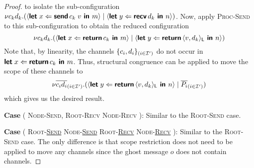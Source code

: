 \begin{proof}
  to isolate the sub-configuration 
  ${\nu{c_k d_k}.{({\langle{\textbf{\textsf{let}}\;{x}\Leftarrow{{\textbf{\textsf{send}}\,{c_k}}\;{v}}\textbf{\textsf{ in }}{m}}\rangle} \mid {\langle{\textbf{\textsf{let}}\;{y}\Leftarrow{\textbf{\textsf{recv}}\,{d_k}}\textbf{\textsf{ in }}{n}}\rangle})}}$.
  Now, apply \textsc{Proc-Send} to this sub-configuration to obtain the reduced configuration
  $$
    {\nu{c_k d_k}.{(
      {\langle{\textbf{\textsf{let}}\;{x}\Leftarrow{\textbf{\textsf{return}}\,{c_k}}\textbf{\textsf{ in }}{m}}\rangle} 
      \mid {\langle{\textbf{\textsf{let}}\;{y}\Leftarrow{\textbf{\textsf{return}}\,{\langle{{v},{d_k}}\rangle_{\textsf{L}}}}\textbf{\textsf{ in }}{n}}\rangle}
    )}}
  $$
  Note that, by linearity, the channels $\{ c_i, d_i \}_{(i \in \mathcal{I}')}$ do not occur in 
  $\textbf{\textsf{let}}\;{x}\Leftarrow{\textbf{\textsf{return}}\,{c_k}}\textbf{\textsf{ in }}{m}$.
  Thus, structural congruence can be applied to move the scope of these channels to
  $${\nu{\overline{c_i d_i}_{(i \in \mathcal{I}')}}.{
    ({\langle{\textbf{\textsf{let}}\;{y}\Leftarrow{\textbf{\textsf{return}}\,{\langle{{v},{d_k}}\rangle_{\textsf{L}}}}\textbf{\textsf{ in }}{n}}\rangle} \mid \overline{P_i}_{(i \in \mathcal{I}')})}}$$
  which gives us the desired result.

\noindent
\textbf{Case} (
  \textsc{Node-Send}, 
  \textsc{Root-Recv}
  \textsc{Node-Recv}
): Similar to the \textsc{Root-Send} case.

\noindent
\textbf{Case} (
  \textsc{Root-\underline{Send}}
  \textsc{Node-\underline{Send}}
  \textsc{Root-\underline{Recv}}
  \textsc{Node-\underline{Recv}}
): Similar to the \textsc{Root-Send} case.
The only difference is that scope restriction does not need to be applied
to move any channels since the ghost message $o$ does not contain channels.


\end{proof}
